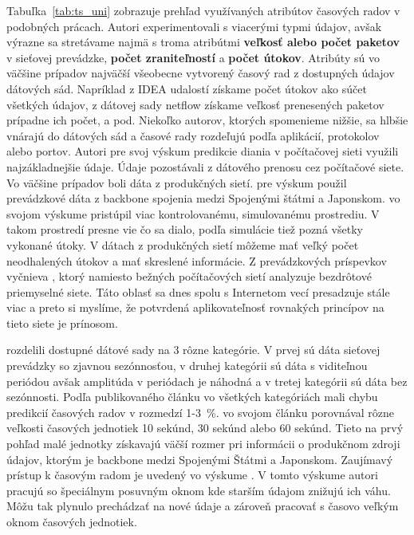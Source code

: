 \documentclass[thesismargins, thesislinespacing, openright, upjsfrontpage, combineabstracts]{rnthesis}
\begin{document}
Tabuľka~\ref{tab:ts_uni} zobrazuje prehľad využívaných atribútov časových radov v podobných prácach. Autori experimentovali s viacerými typmi údajov, avšak výrazne sa stretávame najmä s troma atribútmi \textbf{veľkosť alebo počet paketov} v sieťovej prevádzke, \textbf{počet zraniteľností} a \textbf{počet útokov}. Atribúty sú vo väčšine prípadov najväčší všeobecne vytvorený časový rad z dostupných údajov dátových sád. Napríklad z IDEA udalostí získame počet útokov ako súčet všetkých údajov, z dátovej sady netflow získame veľkosť prenesených paketov prípadne ich počet, a pod. Niekoľko autorov, ktorých spomenieme nižšie, sa hlbšie vnárajú do dátových sád a časové rady rozdeľujú podľa aplikácií, protokolov alebo portov. 
Autori \cite{jiang2004detecting, wei2012intrusion,madan2018predicting, sang2002predictability,wang2008internet,hasegawa2001applications} pre svoj výskum predikcie diania v počítačovej sieti využili najzákladnejšie údaje. Údaje pozostávali z dátového prenosu cez počítačové siete. Vo väčšine prípadov boli dáta z produkčných sietí. \cite{hasegawa2001applications} pre výskum použil prevádzkové dáta z backbone spojenia medzi Spojenými štátmi a Japonskom. \cite{jiang2004detecting} vo svojom výskume pristúpil viac kontrolovanému, simulovanému prostrediu. V takom prostredí presne vie čo sa dialo, podľa simulácie tiež pozná všetky vykonané útoky. V dátach z produkčných sietí môžeme mať veľký počet neodhalených útokov a mať skreslené informácie. Z prevádzkových príspevkov vyčnieva \cite{wei2012intrusion}, ktorý namiesto bežných počítačových sietí analyzuje bezdrôtové priemyselné siete. Táto oblasť sa dnes spolu s Internetom vecí presadzuje stále viac a preto si myslíme, že potvrdená aplikovateľnosť rovnakých princípov na tieto siete je prínosom.

\cite{cortez2012multi} rozdelili dostupné dátové sady na 3 rôzne kategórie. V prvej sú dáta sieťovej prevádzky so zjavnou sezónnosťou, v druhej kategórii sú dáta s viditeľnou periódou avšak amplitúda v periódach je náhodná a v tretej kategórii sú dáta bez sezónnosti. Podľa publikovaného článku vo všetkých kategóriách mali chybu predikcií časových radov v rozmedzí 1-3~\%. \cite{hasegawa2001applications} vo svojom článku porovnával rôzne veľkosti časových jednotiek 10 sekúnd, 30 sekúnd alebo 60 sekúnd. Tieto na prvý pohľad malé jednotky získavajú väčší rozmer pri informácii o produkčnom zdroji údajov, ktorým je backbone medzi Spojenými Štátmi a Japonskom. Zaujímavý prístup k časovým radom je uvedený vo výskume \cite{papagiannaki2005long}. V tomto výskume autori pracujú so špeciálnym posuvným oknom kde starším údajom znižujú ich váhu. Môžu tak plynulo prechádzať na nové údaje a zároveň pracovať s časovo veľkým oknom časových jednotiek.
\end{document}
